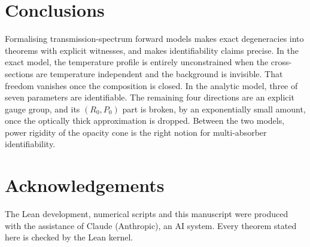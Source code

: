\documentclass[11pt]{article}
\theoremstyle{definition}
\theoremstyle{remark}
\begin{document}
\section{Conclusions}

Formalising transmission-spectrum forward models makes exact degeneracies into theorems with
explicit witnesses, and makes identifiability claims precise. In the exact model, the
temperature profile is entirely unconstrained when the cross-sections are temperature
independent and the background is invisible. That freedom vanishes once the composition is
closed. In the analytic model, three of seven parameters are identifiable. The remaining four
directions are an explicit gauge group, and its $(R_0,P_0)$ part is broken, by an exponentially
small amount, once the optically thick approximation is dropped. Between the two models, power
rigidity of the opacity cone is the right notion for multi-absorber identifiability.

\section*{Acknowledgements}
The Lean development, numerical scripts and this manuscript were produced with the assistance
of Claude (Anthropic), an AI system. Every theorem stated here is checked by the Lean kernel.
\end{document}
